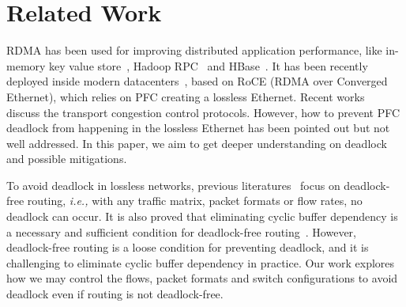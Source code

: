 \secspace
\section{Related Work}
\secspace

 RDMA has been used for improving distributed application performance,
like in-memory key value store~\cite{mitchell13atc, farm, kalia14sigcomm}, 
Hadoop RPC~\cite{hadooprdma} and HBase~\cite{hbaserdma}.
It has been recently deployed inside modern datacenters~\cite{timely,dcqcn,rdmascale}, based on
RoCE (RDMA over Converged Ethernet), which relies on PFC creating a lossless Ethernet.
Recent works~\cite{timely,dcqcn} discuss the transport congestion control protocols. However,
how to prevent PFC deadlock from happening in the lossless Ethernet has been pointed out 
but not well addressed. In this paper, we aim to get deeper understanding on deadlock 
and possible mitigations.

 To avoid deadlock in lossless networks, previous 
literatures~\cite{tcpbolt,karol2003prevention,lash,sancho2004,wu2003fault} focus on deadlock-free routing, 
{\em i.e.,} with any traffic matrix, packet formats or flow rates, no deadlock 
can occur. It is also proved that eliminating cyclic buffer dependency is a necessary and
sufficient condition for deadlock-free routing~\cite{deadlockfree}. However, deadlock-free
routing is a loose condition for preventing deadlock, and it is challenging to eliminate 
cyclic buffer dependency in practice. Our work explores how we may control the flows,
packet formats and switch configurations to avoid deadlock even if routing is not deadlock-free.







